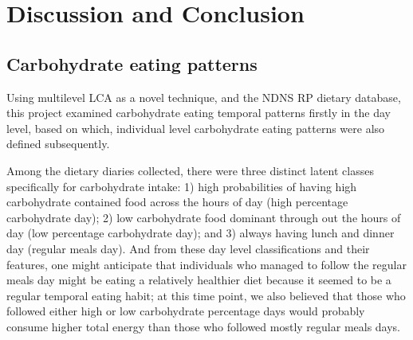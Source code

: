 
\chapter{Discussion and Conclusion} %

\label{Chapter 4} %







\section{Carbohydrate eating patterns}

Using multilevel LCA as a novel technique, and the NDNS RP dietary database, this project examined carbohydrate eating temporal patterns firstly in the day level, based on which, individual level carbohydrate eating patterns were also defined subsequently. 

Among the dietary diaries collected, there were three distinct latent classes specifically for carbohydrate intake: 1) high probabilities of having high carbohydrate contained food across the hours of day (high percentage carbohydrate day); 2) low carbohydrate food dominant through out the hours of day (low percentage carbohydrate day); and 3) always having lunch and dinner day (regular meals day). And from these day level classifications and their features, one might anticipate that individuals who managed to follow the regular meals day might be eating a relatively healthier diet because it seemed to be a regular temporal eating habit; at this time point, we also believed that those who followed either high or low carbohydrate percentage days would probably consume higher total energy than those who followed mostly regular meals days. 


